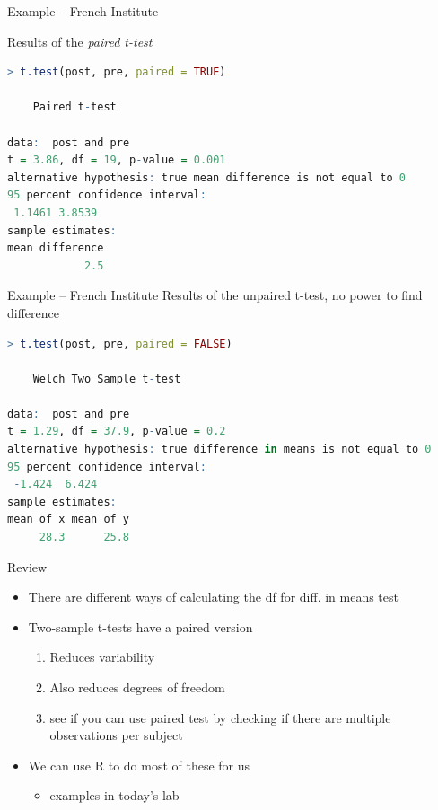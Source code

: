 \documentclass{beamer}
\begin{document}
\begin{frame}[fragile]{Example -- French Institute}

Results of the \textit{paired t-test}

\begin{lstlisting}[language=R,basicstyle=\ttfamily\large]
> t.test(post, pre, paired = TRUE)

	Paired t-test

data:  post and pre
t = 3.86, df = 19, p-value = 0.001
alternative hypothesis: true mean difference is not equal to 0
95 percent confidence interval:
 1.1461 3.8539
sample estimates:
mean difference 
            2.5 
\end{lstlisting}
\end{frame}


\begin{frame}[fragile]{Example -- French Institute}
Results of the unpaired t-test, no power to find difference

\begin{lstlisting}[language=R,basicstyle=\ttfamily\large]
> t.test(post, pre, paired = FALSE)

	Welch Two Sample t-test

data:  post and pre
t = 1.29, df = 37.9, p-value = 0.2
alternative hypothesis: true difference in means is not equal to 0
95 percent confidence interval:
 -1.424  6.424
sample estimates:
mean of x mean of y 
     28.3      25.8 
\end{lstlisting}
\end{frame}

\begin{frame}{Review}
\begin{itemize}
\item There are different ways of calculating the df for diff. in means test
\item Two-sample t-tests have a paired version
\begin{enumerate}
\item Reduces variability
\item Also reduces degrees of freedom
\item see if you can use paired test by checking if there are multiple observations per subject
\end{enumerate}
\item We can use R to do most of these for us
\begin{itemize}
    \item examples in today's lab
\end{itemize}
\end{itemize}
\end{frame}
\end{document}
